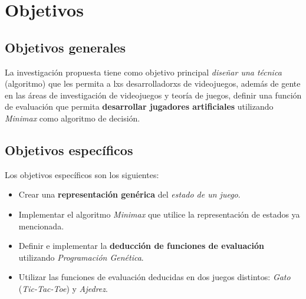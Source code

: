 \section{Objetivos}
  \subsection{Objetivos generales}
    La investigación propuesta tiene como objetivo principal \textit{diseñar una técnica} 
    (algoritmo) que les permita a lxs desarrolladorxs de videojuegos, además de gente en las 
    áreas de investigación de videojuegos y teoría de juegos, definir una función de evaluación que 
    permita \textbf{desarrollar jugadores artificiales} utilizando \textit{Minimax} como algoritmo de decisión.
    
  \subsection{Objetivos específicos}
    Los objetivos específicos son los siguientes:
    
    \begin{itemize}
      \item Crear una \textbf{representación genérica} del \textit{estado de un juego}.
      \item Implementar el algoritmo \textit{Minimax} que utilice la representación de estados ya 
        mencionada.
      \item Definir e implementar la \textbf{deducción de funciones de evaluación} utilizando 
        \textit{Programación Genética}.
      \item Utilizar las funciones de evaluación deducidas en dos juegos distintos: \textit{Gato} 
        (\textit{Tic-Tac-Toe}) y \textit{Ajedrez}.
    \end{itemize}